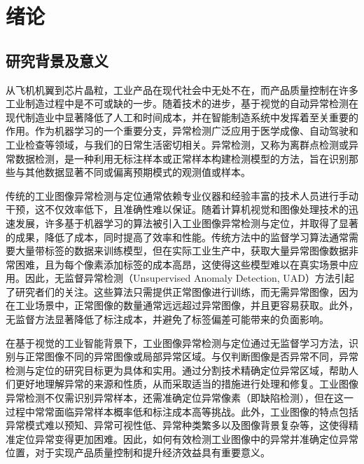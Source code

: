 \documentclass[lang=chs, degree=master, blindreview=false, adobe=false]{yanputhesis}
\begin{document}
\chapter{绪论}
\section{研究背景及意义}

从飞机机翼到芯片晶粒，工业产品在现代社会中无处不在，而产品质量控制在许多工业制造过程中是不可或缺的一步。随着技术的进步，基于视觉的自动异常检测在现代制造业中显著降低了人工和时间成本，并在智能制造系统中发挥着至关重要的作用。作为机器学习的一个重要分支，异常检测广泛应用于医学成像、自动驾驶和工业检查等领域，与我们的日常生活密切相关。异常检测，又称为离群点检测或异常数据检测，是一种利用无标注样本或正常样本构建检测模型的方法，旨在识别那些与其他数据显著不同或偏离预期模式的观测值或样本。

传统的工业图像异常检测与定位通常依赖专业仪器和经验丰富的技术人员进行手动干预，这不仅效率低下，且准确性难以保证。随着计算机视觉和图像处理技术的迅速发展，许多基于机器学习的算法被引入工业图像异常检测与定位，并取得了显著的成果，降低了成本，同时提高了效率和性能。传统方法中的监督学习算法通常需要大量带标签的数据来训练模型，但在实际工业生产中，获取大量异常图像数据非常困难，且为每个像素添加标签的成本高昂，这使得这些模型难以在真实场景中应用。因此，无监督异常检测（Unsupervised Anomaly Detection, UAD）方法引起了研究者们的关注。这些算法只需提供正常图像进行训练，而无需异常图像，因为在工业场景中，正常图像的数量通常远远超过异常图像，并且更容易获取。此外，无监督方法显著降低了标注成本，并避免了标签偏差可能带来的负面影响。

在基于视觉的工业智能背景下，工业图像异常检测与定位通过无监督学习方法，识别与正常图像不同的异常图像或局部异常区域。与仅判断图像是否异常不同，异常检测与定位的研究目标更为具体和实用。通过分割技术精确定位异常区域，帮助人们更好地理解异常的来源和性质，从而采取适当的措施进行处理和修复。工业图像异常检测不仅需识别异常样本，还需准确定位异常像素（即缺陷检测），但在这一过程中常常面临异常样本概率低和标注成本高等挑战。此外，工业图像的特点包括异常模式难以预知、异常可视性低、异常种类繁多以及图像背景复杂等，这使得精准定位异常变得更加困难。因此，如何有效检测工业图像中的异常并准确定位异常位置，对于实现产品质量控制和提升经济效益具有重要意义。
\end{document}
